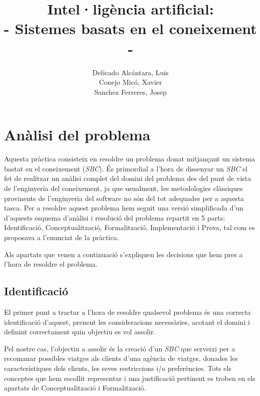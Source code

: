 \documentclass[11pt,a4paper]{article}
\author{
  Delicado Alcántara, Luis
  \\
  Conejo Micó, Xavier
  \\
  Sanchez Ferreres, Josep
}
\title{\Huge {Intel·ligència artificial:}\\ \huge{- Sistemes basats en el coneixement -}}
\begin{document}
\begin{titlepage}
\clearpage\maketitle
\thispagestyle{empty}
\end{titlepage}

\clearpage

\tableofcontents

\newpage

\section{Anàlisi del problema}
Aquesta pràctica consisteix en resoldre un problema donat mitjançant un sistema bastat en el coneixement (\emph{SBC}). És primordial a l'hora de dissenyar un \emph{SBC} el fet de realitzar un anàlisi complet del domini del problema des del punt de vista de l'enginyeria del coneixement, ja que usualment, les metodologies clàssiques provinents de l'enginyeria del software no són del tot adequades per a aquesta tasca. Per a resoldre aquest problema hem seguit una versió simplificada d'un d'aquests esquema d'anàlisi i resolució del problema repartit en 5 parts: Identificació, Conceptualització, Formalització, Implementació i Prova, tal com es proposava a l'enunciat de la pràctica.

Als apartats que venen a continuació s'expliquen les decisions que hem pres a l'hora de resoldre el problema.

\subsection{Identificació}
El primer punt a tractar a l'hora de resoldre qualsevol problema és una correcta identificació d'aquest, prenent les consideracions necessàries, acotant el domini i definint correctament quin objectiu es vol assolir.

Pel nostre cas, l'objectiu a assolir és la creació d'un \emph{SBC} que serveixi per a recomanar possibles viatges als clients d'una agència de viatges, donades les característiques dels clients, les seves restriccions i/o preferències. Tots els conceptes que hem escollit representar i una justificació pertinent es troben en els apartats de Conceptualització i Formalització.
\end{document}
